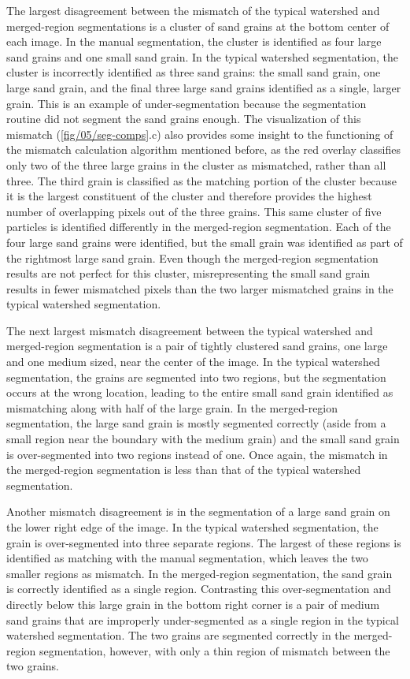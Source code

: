 The largest disagreement between the mismatch of the typical watershed
and merged-region segmentations is a cluster of sand grains at the bottom
center of each image. In the manual segmentation, the cluster is
identified as four large sand grains and one small sand grain. In the typical
watershed segmentation, the cluster is incorrectly identified as three sand
grains: the small sand grain, one large sand grain, and the final three large
sand grains identified as a single, larger grain. This is an example of
under-segmentation because the segmentation routine did not segment the sand
grains enough. The visualization of this
mismatch (\ref{fig/05/seg-comps}.c) also provides some insight to the
functioning of the mismatch calculation algorithm mentioned before, as the red
overlay classifies only two of the three large grains in the cluster as mismatched,
rather than all three. The third grain is classified as the matching portion of
the cluster because it is the largest constituent of the cluster and therefore
provides the highest number of overlapping pixels out of the three grains.
This same cluster of five particles is identified differently in the merged-region
segmentation. Each of the four large sand grains were
identified, but the small grain was identified as part of the rightmost
large sand grain. Even though the merged-region segmentation results are not
perfect for this cluster, misrepresenting the small sand grain results in
fewer mismatched pixels than the two larger mismatched grains in the typical
watershed segmentation.

The next largest mismatch disagreement between the typical
watershed and merged-region segmentation is a pair of tightly clustered sand
grains, one large and one medium sized, near the center of the image. In the
typical watershed segmentation, the grains are segmented into two regions, but
the segmentation occurs at the wrong location, leading to the entire small sand
grain identified as mismatching along with half of the large grain.
In the merged-region segmentation, the large sand grain is mostly segmented
correctly (aside from a small region near the boundary with the medium grain)
and the small sand grain is over-segmented into two regions instead of one.
Once again, the mismatch in the merged-region segmentation is less than that
of the typical watershed segmentation.

Another mismatch disagreement is in the segmentation of a large sand grain on the
lower right edge of the image. In the typical watershed segmentation, the grain
is over-segmented into three separate regions. The largest of these regions is
identified as matching with the manual segmentation, which leaves the two smaller
regions as mismatch. In the merged-region segmentation, the sand grain is correctly
identified as a single region. Contrasting this over-segmentation and directly below
this large grain in the bottom right corner is a pair of medium sand grains that are
improperly under-segmented as a single region in the typical watershed segmentation.
The two grains are segmented correctly in the merged-region segmentation, however,
with only a thin region of mismatch between the two grains.


